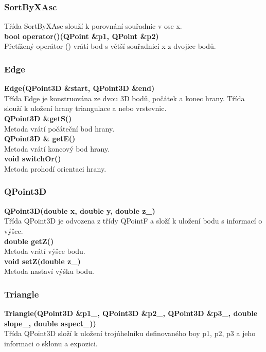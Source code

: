 \documentclass[a4paper, 12pt]{article}
\begin{document}
\subsubsection{SortByXAsc}
Třída SortByXAsc slouží k porovnání souřadnic v ose x.\\


\textbf{bool operator()(QPoint \&p1, QPoint \&p2)}\\
Přetížený operátor () vrátí bod s větší souřadnicí x z dvojice bodů.\\

\subsubsection{Edge}
\textbf{Edge(QPoint3D \&start, QPoint3D \&end)}\\
Třída Edge je konstruována ze dvou 3D bodů, počátek a konec hrany. Třída slouží k uložení hrany triangulace a nebo vrstevnic.\\
    
\textbf{QPoint3D \&getS()}\\
Metoda vrátí počáteční bod hrany.\\

\textbf{QPoint3D \& getE()}\\
Metoda vrátí koncový bod hrany.\\

\textbf{void switchOr()}\\
Metoda prohodí orientaci hrany.\\

\subsubsection{QPoint3D}
\textbf{QPoint3D(double x, double y, double z\_)}\\
Třída QPoint3D je odvozena z třídy QPointF a složí k uložení bodu s informací o výšce.\\

\textbf{double getZ()}\\
Metoda vrátí výšce bodu.\\

\textbf{void setZ(double z\_)}\\
Metoda nastaví výšku bodu.\\

\subsubsection{Triangle}
\textbf{Triangle(QPoint3D \&p1\_, QPoint3D \&p2\_, QPoint3D \&p3\_, double slope\_, double aspect\_))}\\
Třída QPoint3D složí k uložení trojúhelníku definovaného boy p1, p2, p3 a jeho informaci o sklonu a expozici.\\
\end{document}
